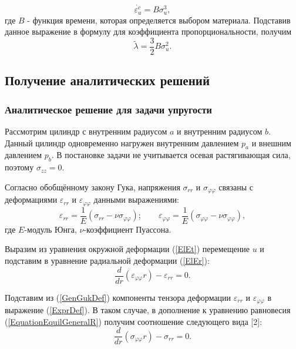 \documentclass[a4paper,14pt]{extarticle}
\begin{document}
\begin{equation}\label{EpsIntCSigmaB}
\dot{\varepsilon_{u}^{c}}=B\sigma_{u}^3,
\end{equation}
где $B$ - функция времени, которая определяется выбором материала. Подставив данное выражение в формулу для коэффициента пропорциональности, получим
\begin{equation}
\tilde{\lambda}=\dfrac{3}{2}B\sigma_{u}^2.
\end{equation}

\newpage

\subsection{Получение аналитических решений}

\subsubsection{Аналитическое решение для задачи упругости}

Рассмотрим цилиндр с внутренним радиусом $a$ и внутренним радиусом $b$. Данный цилиндр одновременно нагружен внутренним давлением $p_a$ и внешним давлением $p_b$. В постановке задачи не учитывается осевая растягивающая сила, поэтому $\sigma_{zz}=0$.

Согласно обобщённому закону Гука, напряжения $\sigma_{rr}$ и $\sigma_{\varphi\varphi}$ связаны с деформациями $\varepsilon_{rr}$ и $\varepsilon_{\varphi\varphi}$ данными выражениями:
\begin{equation}\label{GenGukDef}
\varepsilon_{rr}=\frac{1}{E}\left(\sigma_{rr}-\nu \sigma_{\varphi\varphi}\right); \qquad \varepsilon_{\varphi\varphi}=\frac{1}{E}\left(\sigma_{\varphi\varphi}-\nu \sigma_{\varphi\varphi}\right),
\end{equation}
где $E$-модуль Юнга, $\nu$-коэффициент Пуассона.

Выразим из уравнения окружной деформации (\ref{ElEt}) перемещение $u$ и подставим в уравнение радиальной деформации (\ref{ElEr}):
\begin{equation}\label{ExprDef}
\frac{d}{dr}(\varepsilon_{\varphi\varphi} r)-\varepsilon_{rr}=0.
\end{equation} 

Подставим из (\ref{GenGukDef}) компоненты тензора деформации $\varepsilon_{rr}$ и $\varepsilon_{\varphi\varphi}$ в выражение (\ref{ExprDef}). В таком случае, в дополнение к уравнению равновесия (\ref{EquationEquilGeneralR}) получим соотношение следующего вида [2]:
\begin{equation}\label{EquationEquilGeneralRAlt}
\frac{d}{dr}(\sigma_{\varphi\varphi} r)-\sigma_{rr}=0.
\end{equation}
\end{document}
